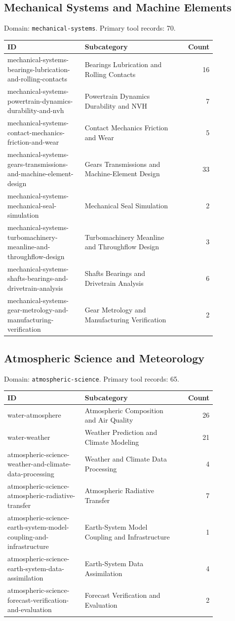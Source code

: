 \subsection{Mechanical Systems and Machine Elements}
\noindent Domain: \texttt{mechanical-systems}. Primary tool records: 70.
\begin{longtable}{p{0.37\linewidth}p{0.47\linewidth}r}
ID & Subcategory & Count\\\hline\endhead
mechanical-systems-bearings-lubrication-and-rolling-contacts & Bearings Lubrication and Rolling Contacts & 16\\
mechanical-systems-powertrain-dynamics-durability-and-nvh & Powertrain Dynamics Durability and NVH & 7\\
mechanical-systems-contact-mechanics-friction-and-wear & Contact Mechanics Friction and Wear & 5\\
mechanical-systems-gears-transmissions-and-machine-element-design & Gears Transmissions and Machine-Element Design & 33\\
mechanical-systems-mechanical-seal-simulation & Mechanical Seal Simulation & 2\\
mechanical-systems-turbomachinery-meanline-and-throughflow-design & Turbomachinery Meanline and Throughflow Design & 3\\
mechanical-systems-shafts-bearings-and-drivetrain-analysis & Shafts Bearings and Drivetrain Analysis & 6\\
mechanical-systems-gear-metrology-and-manufacturing-verification & Gear Metrology and Manufacturing Verification & 2\\
\end{longtable}
\subsection{Atmospheric Science and Meteorology}
\noindent Domain: \texttt{atmospheric-science}. Primary tool records: 65.
\begin{longtable}{p{0.37\linewidth}p{0.47\linewidth}r}
ID & Subcategory & Count\\\hline\endhead
water-atmosphere & Atmospheric Composition and Air Quality & 26\\
water-weather & Weather Prediction and Climate Modeling & 21\\
atmospheric-science-weather-and-climate-data-processing & Weather and Climate Data Processing & 4\\
atmospheric-science-atmospheric-radiative-transfer & Atmospheric Radiative Transfer & 7\\
atmospheric-science-earth-system-model-coupling-and-infrastructure & Earth-System Model Coupling and Infrastructure & 1\\
atmospheric-science-earth-system-data-assimilation & Earth-System Data Assimilation & 4\\
atmospheric-science-forecast-verification-and-evaluation & Forecast Verification and Evaluation & 2\\
\end{longtable}
